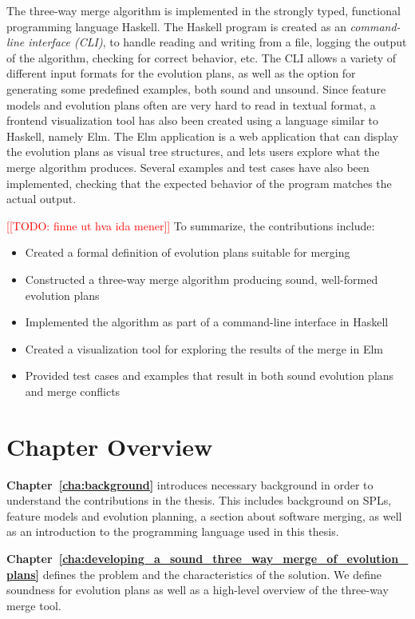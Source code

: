 \documentclass[a4paper,english]{ifimaster}
\newcommand{\todo}[1]{\textcolor{red}{[[TODO: #1]]}\PackageWarning{TODO:}{#1!}}
\begin{document}
The three-way merge algorithm is implemented in the strongly typed, functional programming language Haskell. The Haskell program is created as an \textit{command-line interface (CLI)}, to handle reading and writing from a file, logging the output of the algorithm, checking for correct behavior, etc. The CLI allows a variety of different input formats for the evolution plans, as well as the option for generating some predefined examples, both sound and unsound. Since feature models and evolution plans often are very hard to read in textual format, a frontend visualization tool has also been created using a language similar to Haskell, namely Elm. The Elm application is a web application that can display the evolution plans as visual tree structures, and lets users explore what the merge algorithm produces. Several examples and test cases have also been implemented, checking that the expected behavior of the program matches the actual output.

\todo{finne ut hva ida mener}
To summarize, the contributions include:

\begin{itemize}
  \item Created a formal definition of evolution plans suitable for merging
  \item Constructed a three-way merge algorithm producing sound, well-formed evolution plans
  \item Implemented the algorithm as part of a command-line interface in Haskell
  \item Created a visualization tool for exploring the results of the merge in Elm
  \item Provided test cases and examples that result in both sound evolution plans and merge conflicts
\end{itemize}

\section{Chapter Overview}%
\label{sec:chapter_overview}

\textbf{Chapter~\ref{cha:background}} introduces necessary background in order to understand the contributions in the thesis. This includes background on SPLs, feature models and evolution planning, a section about software merging, as well as an introduction to the programming language used in this thesis.

\textbf{Chapter~\ref{cha:developing_a_sound_three_way_merge_of_evolution_plans}} defines the problem and the characteristics of the solution. We define soundness for evolution plans as well as a high-level overview of the three-way merge tool.
\end{document}
